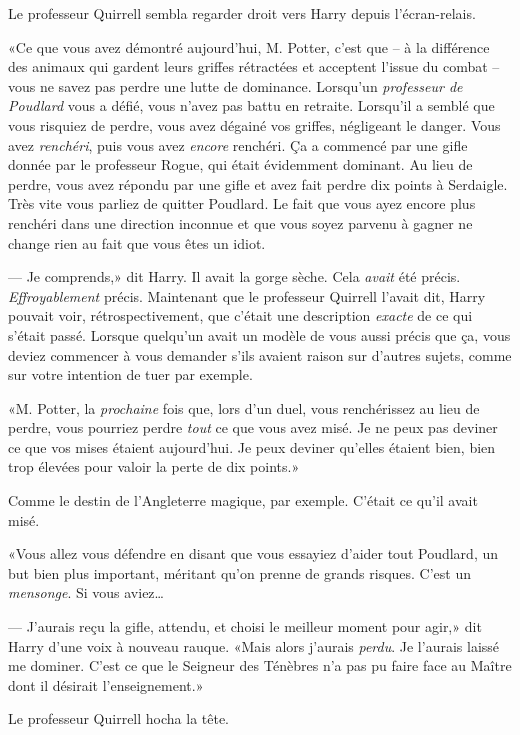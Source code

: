 Le professeur Quirrell sembla regarder droit vers Harry depuis l'écran-relais.

«Ce que vous avez démontré aujourd'hui, M. Potter, c'est que -- à la différence des animaux qui gardent leurs griffes rétractées et acceptent l'issue du combat -- vous ne savez pas perdre une lutte de dominance. Lorsqu'un \emph{professeur de Poudlard} vous a défié, vous n'avez pas battu en retraite. Lorsqu'il a semblé que vous risquiez de perdre, vous avez dégainé vos griffes, négligeant le danger. Vous avez \emph{renchéri}, puis vous avez \emph{encore} renchéri. Ça a commencé par une gifle donnée par le professeur Rogue, qui était évidemment dominant. Au lieu de perdre, vous avez répondu par une gifle et avez fait perdre dix points à Serdaigle. Très vite vous parliez de quitter Poudlard. Le fait que vous ayez encore plus renchéri dans une direction inconnue et que vous soyez parvenu à gagner ne change rien au fait que vous êtes un idiot.

--- Je comprends,» dit Harry. Il avait la gorge sèche. Cela \emph{avait} été précis. \emph{Effroyablement} précis. Maintenant que le professeur Quirrell l'avait dit, Harry pouvait voir, rétrospectivement, que c'était une description \emph{exacte} de ce qui s'était passé. Lorsque quelqu'un avait un modèle de vous aussi précis que ça, vous deviez commencer à vous demander s'ils avaient raison sur d'autres sujets, comme sur votre intention de tuer par exemple.

«M. Potter, la \emph{prochaine} fois que, lors d'un duel, vous renchérissez au lieu de perdre, vous pourriez perdre \emph{tout} ce que vous avez misé. Je ne peux pas deviner ce que vos mises étaient aujourd'hui. Je peux deviner qu'elles étaient bien, bien trop élevées pour valoir la perte de dix points.»

Comme le destin de l'Angleterre magique, par exemple. C'était ce qu'il avait misé.

«Vous allez vous défendre en disant que vous essayiez d'aider tout Poudlard, un but bien plus important, méritant qu'on prenne de grands risques. C'est un \emph{mensonge}. Si vous aviez…

--- J'aurais reçu la gifle, attendu, et choisi le meilleur moment pour agir,» dit Harry d'une voix à nouveau rauque. «Mais alors j'aurais \emph{perdu}. Je l'aurais laissé me dominer. C'est ce que le Seigneur des Ténèbres n'a pas pu faire face au Maître dont il désirait l'enseignement.»

Le professeur Quirrell hocha la tête.

